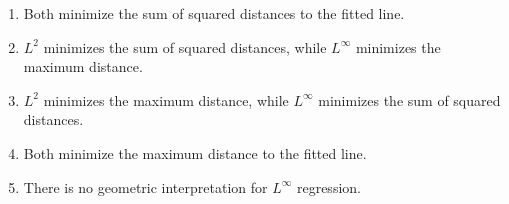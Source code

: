 \documentclass{article}%
\begin{document}
\begin{enumerate}
\begin{enumerate}%
\item Both minimize the sum of squared distances to the fitted line.%
\item $L^2$ minimizes the sum of squared distances, while $L^\infty$ minimizes the maximum distance.%
\item $L^2$ minimizes the maximum distance, while $L^\infty$ minimizes the sum of squared distances.%
\item Both minimize the maximum distance to the fitted line.%
\item There is no geometric interpretation for $L^\infty$ regression.%
\end{enumerate}%
\vspace{1em}%
\end{enumerate}

%
\newpage%
\end{document}
